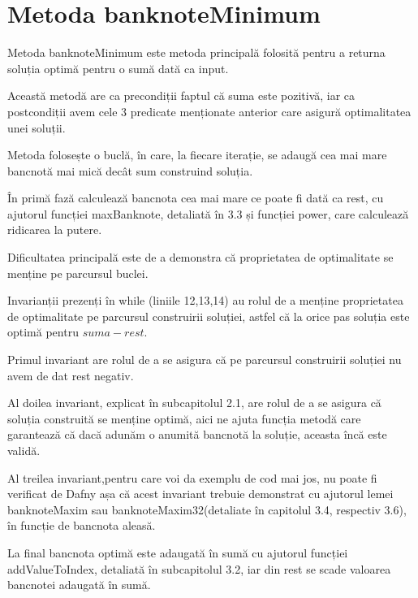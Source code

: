   \section{Metoda banknoteMinimum}
    Metoda banknoteMinimum este metoda principală folosită pentru a returna soluția optimă pentru o sumă dată ca 
    input.\par
    Această metodă are ca precondiții faptul că suma este pozitivă, iar ca postcondiții avem cele 3 predicate menționate 
    anterior care asigură optimalitatea unei soluții.\par
    Metoda folosește o buclă, în care, la fiecare iterație, se adaugă cea mai mare bancnotă mai mică decât sum construind soluția.\par
    În primă fază calculează bancnota cea mai mare ce poate fi dată ca rest, cu ajutorul funcției maxBanknote, detaliată în 3.3 și funcției 
    power, care calculează ridicarea la putere.\par
    Dificultatea principală este de a demonstra că proprietatea de optimalitate se menține pe parcursul buclei.\par
    Invarianții prezenți în while (liniile 12,13,14) au rolul de a menține proprietatea de optimalitate 
    pe parcursul construirii soluției, astfel că la orice pas soluția este optimă pentru $suma-rest$.\par
    Primul invariant are rolul de a se asigura că pe parcursul construirii soluției nu avem de dat rest negativ.\par
    Al doilea invariant, explicat în subcapitolul 2.1, are rolul de a se asigura că soluția construită se menține optimă, aici ne ajuta funcția 
    metodă care garantează că dacă adunăm o anumită bancnotă la soluție, aceasta încă este validă.\par
    Al treilea invariant,pentru care voi da exemplu de cod mai jos, nu poate fi verificat de Dafny așa că acest invariant trebuie demonstrat cu ajutorul lemei banknoteMaxim sau banknoteMaxim32(detaliate în capitolul 3.4, respectiv 3.6), 
    în funcție de bancnota aleasă.\par
    La final bancnota optimă este adaugată în sumă cu ajutorul funcției addValueToIndex, detaliată în subcapitolul 3.2, iar din rest se scade valoarea bancnotei adaugată în sumă.
